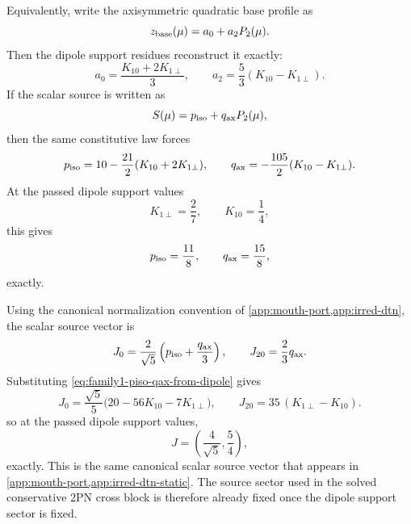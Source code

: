 \documentclass[11pt]{article}
\newcommand{\TwoPN}{\mathrm{2PN}}
\begin{document}
Equivalently, write the axisymmetric quadratic base profile as
\begin{equation}
z_{\rm base}(\mu)=a_0+a_2P_2(\mu).
\label{eq:family1-a0a2}
\end{equation}
Then the dipole support residues reconstruct it exactly:
\begin{equation}
a_0=\frac{K_{10}+2K_{1\perp}}{3},
\qquad
a_2=\frac{5}{3}(K_{10}-K_{1\perp}).
\label{eq:family1-a0a2-from-dipole}
\end{equation}
If the scalar source is written as
\begin{equation}
S(\mu)=p_{\rm iso}+q_{\rm ax}P_2(\mu),
\label{eq:family1-piso-qax}
\end{equation}
then the same constitutive law forces
\begin{equation}
p_{\rm iso}=10-\frac{21}{2}(K_{10}+2K_{1\perp}),
\qquad
q_{\rm ax}=-\frac{105}{2}(K_{10}-K_{1\perp}).
\label{eq:family1-piso-qax-from-dipole}
\end{equation}
At the passed dipole support values
\begin{equation}
K_{1\perp}=\frac27,
\qquad
K_{10}=\frac14,
\label{eq:family1-passed-dipole-values}
\end{equation}
this gives
\begin{equation}
p_{\rm iso}=\frac{11}{8},
\qquad
q_{\rm ax}=\frac{15}{8},
\label{eq:family1-piso-qax-values}
\end{equation}
exactly.

Using the canonical normalization convention of \cref{app:mouth-port,app:irred-dtn}, the
scalar source vector is
\begin{equation}
J_0=\frac{2}{\sqrt5}\left(p_{\rm iso}+\frac{q_{\rm ax}}{3}\right),
\qquad
J_{20}=\frac23 q_{\rm ax}.
\label{eq:family1-J0J20-def}
\end{equation}
Substituting \cref{eq:family1-piso-qax-from-dipole} gives
\begin{equation}
J_0=\frac{\sqrt5}{5}\bigl(20-56K_{10}-7K_{1\perp}\bigr),
\qquad
J_{20}=35\,(K_{1\perp}-K_{10}).
\label{eq:family1-J-from-dipole}
\end{equation}
so at the passed dipole support values,
\begin{equation}
J=\left(\frac{4}{\sqrt5},\frac54\right),
\label{eq:family1-J-final}
\end{equation}
exactly.  This is the same canonical scalar source vector that appears in
\cref{app:mouth-port,app:irred-dtn-static}.  The source sector used in the solved
conservative \(\TwoPN\) cross block is therefore already fixed once the dipole support
sector is fixed.
\end{document}
